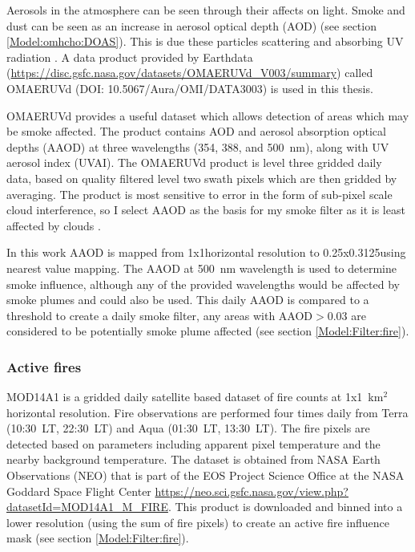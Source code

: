       Aerosols in the atmosphere can be seen through their affects on light. 
      Smoke and dust can be seen as an increase in aerosol optical depth (AOD) (see section \ref{Model:omhcho:DOAS}).
      This is due these particles scattering and absorbing UV radiation \parencite{Ahn2008}.
      A data product provided by Earthdata (\url{https://disc.gsfc.nasa.gov/datasets/OMAERUVd_V003/summary}) called OMAERUVd (DOI: 10.5067/Aura/OMI/DATA3003) is used in this thesis. 
      
      
      OMAERUVd provides a useful dataset which allows detection of areas which may be smoke affected.
      The product contains AOD and aerosol absorption optical depths (AAOD) at three wavelengths (354, 388, and 500~nm), along with UV aerosol index (UVAI).
      The OMAERUVd product is level three gridded daily data, based on quality filtered level two swath pixels which are then gridded by averaging.
      The product is most sensitive to error in the form of sub-pixel scale cloud interference, so I select AAOD as the basis for my smoke filter as it is least affected by clouds \parencite{Ahn2008}.
      
      In this work AAOD is mapped from 1x1\degr horizontal resolution to 0.25x0.3125\degr using nearest value mapping.
      The AAOD at 500~nm wavelength is used to determine smoke influence, although any of the provided wavelengths would be affected by smoke plumes and could also be used.
      This daily AAOD is compared to a threshold to create a daily smoke filter, any areas with AAOD$>0.03$ are considered to be potentially smoke plume affected (see section \ref{Model:Filter:fire}).
    
    \subsubsection{Active fires}
      \label{Model:Datasets:MOD14A1}
      MOD14A1 is a gridded daily satellite based dataset of fire counts at 1x1~km$^2$ horizontal resolution.
      Fire observations are performed four times daily from Terra (10:30~LT, 22:30~LT) and Aqua (01:30~LT, 13:30~LT).
      The fire pixels are detected based on parameters including apparent pixel temperature and the nearby background temperature.
      The dataset is obtained from NASA Earth Observations (NEO) that is part of the EOS Project Science Office at the NASA Goddard Space Flight Center \url{https://neo.sci.gsfc.nasa.gov/view.php?datasetId=MOD14A1_M_FIRE}.
      This product is downloaded and binned into a lower resolution (using the sum of fire pixels) to create an active fire influence mask (see section \ref{Model:Filter:fire}).
      
